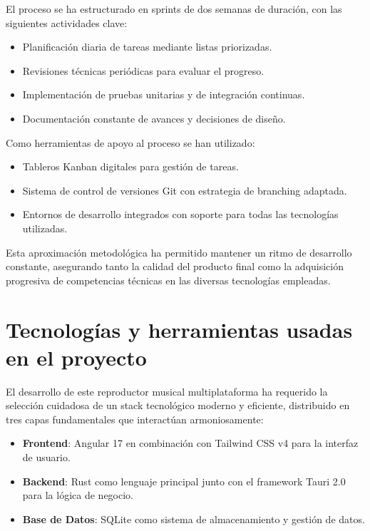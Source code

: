 \documentclass[11pt, a4paper]{article}
\begin{document}
El proceso se ha estructurado en sprints de dos semanas de duración, con las siguientes actividades clave:
\begin{itemize}
    \item Planificación diaria de tareas mediante listas priorizadas.
    \item Revisiones técnicas periódicas para evaluar el progreso.
    \item Implementación de pruebas unitarias y de integración continuas.
    \item Documentación constante de avances y decisiones de diseño.
\end{itemize}

Como herramientas de apoyo al proceso se han utilizado:
\begin{itemize}
    \item Tableros Kanban digitales para gestión de tareas.
    \item Sistema de control de versiones Git con estrategia de branching adaptada.
    \item Entornos de desarrollo integrados con soporte para todas las tecnologías utilizadas.
\end{itemize}

Esta aproximación metodológica ha permitido mantener un ritmo de desarrollo constante, asegurando tanto la calidad del producto final como la adquisición progresiva de competencias técnicas en las diversas tecnologías empleadas.

\section{Tecnologías y herramientas usadas en el proyecto}

El desarrollo de este reproductor musical multiplataforma ha requerido la selección cuidadosa de un stack tecnológico moderno y eficiente, distribuido en tres capas fundamentales que interactúan armoniosamente:

\begin{itemize}
    \item \textbf{Frontend}: Angular 17 en combinación con Tailwind CSS v4 para la interfaz de usuario.
    \item \textbf{Backend}: Rust como lenguaje principal junto con el framework Tauri 2.0 para la lógica de negocio.
    \item \textbf{Base de Datos}: SQLite como sistema de almacenamiento y gestión de datos.
\end{itemize}
\end{document}
